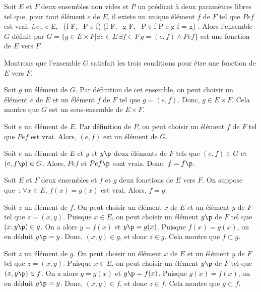 \blank[medium]

\noindent{} Soit $E$ et $F$ deux ensembles non vides et $P$ un prédicat à deux paramètres libres tel que, pour tout élément $e$ de $E$, il existe un unique élément $f$ de $F$ tel que $P e f$ est vrai, \emph{i.e.}, 
\startformula
    \forall e \in E, \, 
        (\exists f \in F, \, P e f)
        \wedge 
        (\forall f \in F, \, \forall g \in F, \, P e f \wedge P e g \Rightarrow f = g) .
\stopformula
Alors l'ensemble $G$ définit par $G = \lbrace g \in E \times F \vert \exists e \in E \, \exists f \in F \, g = (e,f) \wedge P e f \rbrace$ est une fonction de $E$ vers $F$. 

\blank[medium]

\noindent{} Montrons que l'ensemble $G$ satisfait les trois conditions pour être une fonction de $E$ vers $F$.
\startitemize[nowhite]
    \item Soit $g$ un élément de $G$. 
        Par définition de cet ensemble, on peut choisir un élément $e$ de $E$ et un élément $f$ de $F$ tel que $g = (e,f)$. 
        Donc, $g \in E \times F$. 
        Cela montre que $G$ est un sous-ensemble de $E \times F$.
    \item Soit $e$ un élément de $E$.
        Par définition de $P$, on peut choisir un élément $f$ de $F$ tel que $P e f$ est vrai.
        Alors, $(e,f)$ est un élément de $G$.
    \item Soit $e$ un élément de $E$ et $y$ et $y\p$ deux éléments de $F$ tels que $(e,f) \in G$ et $(e,f\p) \in G$.
        Alors, $P e f$ et $P e f\p$ sont vrais.
        Donc, $f = f\p$. 
\stopitemize

\done

\blank[medium]

\noindent{} Soit $E$ et $F$ deux ensembles et $f$ et $g$ deux fonctions de $E$ vers $F$. 
    On suppose que : $\forall x \in E, \, f(x) = g(x)$ est vrai. 
    Alors, $f = g$.

\blank[medium]

\noindent{} 
    Soit $z$ un élément de $f$. 
    On peut choisir un élément $x$ de $E$ et un élément $y$ de $F$ tel que $z = (x,y)$. 
    Puisque $x \in E$, on peut choisir un élément $y\p$ de $F$ tel que $(x,y\p) \in g$. 
    On a alors $y = f(x)$ et $y\p = g(x)$. 
    Puisque $f(x) = g(x)$, on en déduit $y\p = y$. 
    Donc, $(x,y) \in g$, et donc $z \in g$. 
    Cela montre que $f \subset g$.
    
    Soit $z$ un élément de $g$. 
    On peut choisir un élément $x$ de $E$ et un élément $y$ de $F$ tel que $z = (x,y)$. 
    Puisque $x \in E$, on peut choisir un élément $y\p$ de $F$ tel que $(x,y\p) \in f$. 
    On a alors $y = g(x)$ et $y\p = f(x)$. 
    Puisque $g(x) = f(x)$, on en déduit $y\p = y$. 
    Donc, $(x,y) \in f$, et donc $z \in f$. 
    Cela montre que $g \subset f$.

